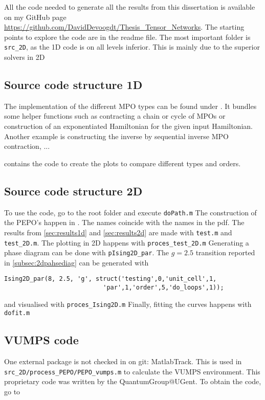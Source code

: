 
All the code needed to generate all the results from this dissertation is available on my GitHub page \url{https://github.com/DavidDevoogdt/Thesis_Tensor_Networks}. The starting points to explore the code are in the readme file. The most important folder is \verb#src_2D#, as the 1D code is on all levels inferior. This is mainly due to the superior solvers in 2D

\subsection{Source code structure 1D}

The implementation of the different \Gls{MPO} types can be found under . It bundles some helper functions such as contracting a chain or cycle of  \Glspl{MPO} or construction of an exponentiated Hamiltonian for the given input Hamiltonian. Another example is constructing the inverse by sequential inverse \Gls{MPO} contraction, ...

 contains the code to create the plots to compare different types and orders.

\subsection{Source code structure 2D}

To use the code, go to the root folder and execute  \verb#doPath.m#
The construction of the PEPO's happen in . The names coincide with the names in the pdf.
The results from \cref{sec:results1d} and \cref{sec:results2d} are made with  \verb#test.m# and \verb#test_2D.m#. The plotting in 2D happens with \verb#proces_test_2D.m#
Generating a phase diagram can be done with \verb#pIsing2D_par#. The $g=2.5$ transition reported in \cref{subsec:2dpahsediag} can be generated with
\begin{verbatim}
Ising2D_par(8, 2.5, 'g', struct('testing',0,'unit_cell',1,
                           'par',1,'order',5,'do_loops',1));
\end{verbatim}
and visualised with \verb#proces_Ising2D.m# Finally, fitting the curves happens with \verb#dofit.m#

\subsection{\Gls{VUMPS} code}
One external package is not checked in on git: MatlabTrack. This is used in  \verb#src_2D/process_PEPO/PEPO_vumps.m# to calculate the \Gls{VUMPS} environment. This proprietary code was written by the QuantumGroup@UGent. To obtain the code, go to 
